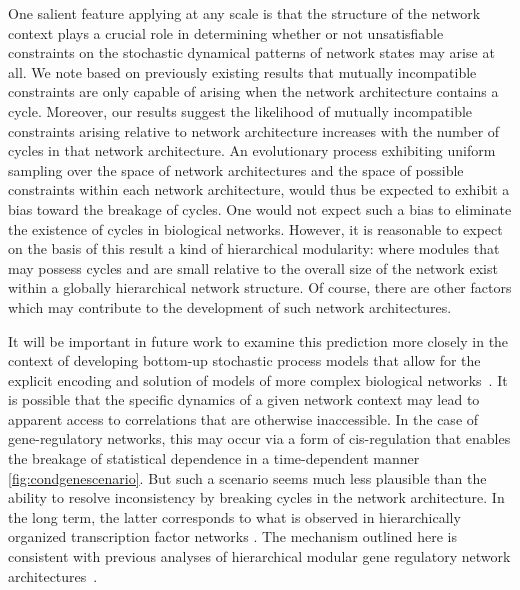 One salient feature applying at any scale is that the structure of the network context plays a crucial role in determining whether or not unsatisfiable constraints on the stochastic dynamical patterns of network states may arise at all. We note based on previously existing results that mutually incompatible constraints are only capable of arising when the network architecture contains a cycle. Moreover, our results suggest the likelihood of mutually incompatible constraints arising relative to network architecture increases with the number of cycles in that network architecture. An evolutionary process exhibiting uniform sampling over the space of network architectures and the space of possible constraints within each network architecture, would thus be expected to exhibit a bias toward the breakage of cycles. One would not expect such a bias to eliminate the existence of cycles in biological networks. However, it is reasonable to expect on the basis of this result a kind of hierarchical modularity: where modules that may possess cycles and are small relative to the overall size of the network exist within a globally hierarchical network structure. Of course, there are other factors which may contribute to the development of such network architectures.

It will be important in future work to examine this prediction more closely in the context of developing bottom-up stochastic process models that allow for the explicit encoding and solution of models of more complex biological networks~\cite{Walczak2009,Mugler2009}. It is possible that the specific dynamics of a given network context may lead to apparent access to correlations that are otherwise inaccessible. In the case of gene-regulatory networks, this may occur via a form of cis-regulation that enables the breakage of statistical dependence in a time-dependent manner \autoref{fig:condgenescenario}. But such a scenario seems much less plausible than the ability to resolve inconsistency by breaking cycles in the network architecture. In the long term, the latter corresponds to what is observed in hierarchically organized transcription factor networks \cite{Jothi2009,Bhardwaj2010,Chalancon2012,Colm}. The mechanism outlined here is consistent with previous analyses of hierarchical modular gene regulatory network architectures~\cite{Ravasz2002,Segre2005,Wagner2007,Erwin2009,Jothi2009,Bhardwaj2010,Colm}.

